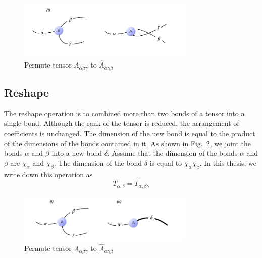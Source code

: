 \begin{figure}[H]
	\centering
	\includegraphics[width=0.75\textwidth]{figures/fig224.png}
	\caption[The permutation of a tensor.]{ Permute tensor $A_{\alpha \beta \gamma}$ to $\hat{A}_{\alpha \gamma \beta}$ }
	\label{fig224}
\end{figure}

\subsection{Reshape}
\label{reshape}
The reshape operation is to combined more than two bonds of a tensor into a single bond. Although the rank of the tensor is reduced, the arrangement of coefficients is unchanged. The dimension of the new bond is equal to the product of the dimensions of the bonds contained in it. As shown in Fig.~\ref{figreshape}, we joint the bonds $\alpha$ and $\beta$ into a new bond $\delta$. Assume that the dimension of the bonds $\alpha$ and $\beta$ are $\chi_{\alpha}$ and $\chi_{\beta}$. The dimension of the bond $\delta$ is equal to $\chi_{\alpha}\chi_{\beta}$. In this thesis, we write down this operation as\begin{align}
	T_{\alpha, \delta} = T_{\alpha, \beta \gamma}
\end{align}

\begin{figure}[H]
	\centering
	\includegraphics[width=0.75\textwidth]{figures/figreshape.png}
	\caption[The permutation of a tensor.]{ Permute tensor $A_{\alpha \beta \gamma}$ to $\hat{A}_{\alpha \gamma \beta}$ }
	\label{figreshape}
\end{figure} 


